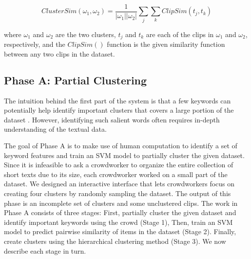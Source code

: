 \begin{equation}
	ClusterSim(\omega_1, \omega_2) = \frac{1}{|\omega_1||\omega_2|} \sum_j \sum_k ClipSim(t_j, t_k)
\end{equation}

where $\omega_1$ and $\omega_2$ are the two clusters, $t_j$ and $t_k$ are each of the
clips in $\omega_1$ and $\omega_2$, respectively, and the $ClipSim()$ function is
the given similarity function between any two clips in the dataset.


\subsection{Phase A: Partial Clustering}

The intuition behind the first part of the system is that a few
keywords can potentially help identify important clusters that covers a
large portion of the dataset \cite{huang2006text}. However, identifying such
salient words often requires in-depth understanding of the textual data.

The goal of Phase A is to make use of human computation to identify a set of
keyword features and train an SVM model to partially cluster the given
dataset.  Since it is infeasible to ask a crowdworker to organize the entire
collection of short texts due to its size, each crowdworker
worked on a small part of the dataset.  We designed an interactive interface
that lets crowdworkers focus on creating four clusters by randomly sampling
the dataset.  The output of this phase is an incomplete set of clusters
and some unclustered clips.  The work in Phase A consists of three stages: First,
partially cluster the given dataset and identify important keywords using the
crowd (Stage 1), Then, train an SVM model to predict pairwise similarity of items in
the dataset (Stage 2). Finally, create clusters using the hierarchical clustering
method (Stage 3). We now describe each stage in turn.

